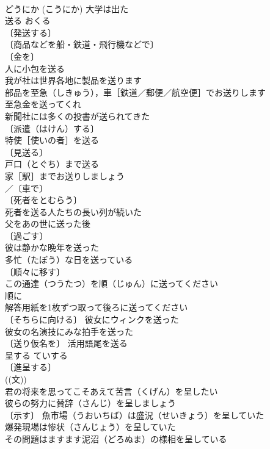 \documentclass[8pt]{extreport}
\begin{document}
\begin{CJK}{UTF8}{min}
\\	どうにか (こうにか) 大学は出た 
\\	送る	おくる	
\\	〔発送する〕
\\	〔商品などを船・鉄道・飛行機などで〕
\\	〔金を〕
\\	人に小包を送る 
\\	我が社は世界各地に製品を送ります 
\\	部品を至急（しきゅう），車［鉄道／郵便／航空便］でお送りします 
\\	至急金を送ってくれ 
\\	新聞社には多くの投書が送られてきた 
\\	〔派遣（はけん）する〕
\\	特使［使いの者］を送る 
\\	〔見送る〕
\\	戸口（とぐち）まで送る 
\\	家［駅］までお送りしましょう 
\\	／〔車で〕
\\	〔死者をとむらう〕　
\\	死者を送る人たちの長い列が続いた 
\\	父をあの世に送った後 
\\	〔過ごす〕　
\\	彼は静かな晩年を送った 
\\	多忙（たぼう）な日を送っている 
\\	〔順々に移す〕
\\	この通達（つうたつ）を順（じゅん）に送ってください 
\\	順に　
\\	解答用紙を1枚ずつ取って後ろに送ってください 
\\	〔そちらに向ける〕 彼女にウィンクを送った 
\\	彼女の名演技にみな拍手を送った 
\\	〔送り仮名を〕 活用語尾を送る 
\\	呈する	ていする	
\\	〔進呈する〕
\\	((文)) 
\\	君の将来を思ってこそあえて苦言（くげん）を呈したい 
\\	彼らの努力に賛辞（さんじ）を呈しましょう 
\\	〔示す〕 魚市場（うおいちば）は盛況（せいきょう）を呈していた 
\\	爆発現場は惨状（さんじょう）を呈していた 
\\	その問題はますます泥沼（どろぬま）の様相を呈している 

\end{CJK}
\end{document}
